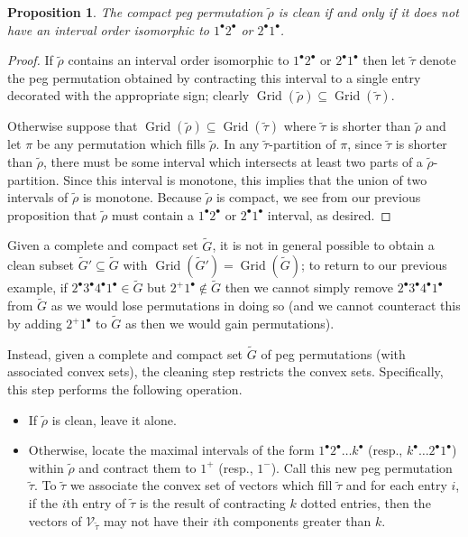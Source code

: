 \documentclass[10pt]{article}
\theoremstyle{plain}
\newtheorem{proposition}[theorem]{Proposition}
\theoremstyle{definition}
\newcommand{\Grid}{\operatorname{Grid}}
\newcommand{\p}[1]{#1^+}
\newcommand{\m}[1]{#1^-}
\renewcommand{\d}[1]{#1^{\bullet}}
\begin{document}
\begin{proposition}
\label{prop-clean-iff}
The compact peg permutation $\tilde{\rho}$ is clean if and only if it does not have an interval order isomorphic to $\d{1}\d{2}$ or $\d{2}\d{1}$.
\end{proposition}
\begin{proof}
If $\tilde{\rho}$ contains an interval order isomorphic to $\d{1}\d{2}$ or $\d{2}\d{1}$ then let $\tilde{\tau}$ denote the peg permutation obtained by contracting this interval to a single entry decorated with the appropriate sign; clearly $\Grid(\tilde{\rho})\subseteq\Grid(\tilde{\tau})$.

Otherwise suppose that $\Grid(\tilde{\rho})\subseteq\Grid(\tilde{\tau})$ where $\tilde{\tau}$ is shorter than $\tilde{\rho}$ and let $\pi$ be any permutation which fills $\tilde{\rho}$. In any $\tilde{\tau}$-partition of $\pi$, since $\tilde{\tau}$ is shorter than $\tilde{\rho}$, there must be some interval which intersects at least two parts of a $\tilde{\rho}$-partition. Since this interval is monotone, this implies that the union of two intervals of $\tilde{\rho}$ is monotone. Because $\tilde{\rho}$ is compact, we see from our previous proposition that $\tilde{\rho}$ must contain a $\d{1}\d{2}$ or $\d{2}\d{1}$ interval, as desired.
\end{proof}

Given a complete and compact set $\tilde{G}$, it is not in general possible to obtain a clean subset $\tilde{G}'\subseteq\tilde{G}$ with $\Grid(\tilde{G}')=\Grid(\tilde{G})$; to return to our previous example, if $\d{2}\d{3}\d{4}\d{1}\in\tilde{G}$ but $\p{2}\d{1}\notin\tilde{G}$ then we cannot simply remove $\d{2}\d{3}\d{4}\d{1}$ from $\tilde{G}$ as we would lose permutations in doing so (and we cannot counteract this by adding $\p{2}\d{1}$ to $\tilde{G}$ as then we would gain permutations).

Instead, given a complete and compact set $\tilde{G}$ of peg permutations (with associated convex sets), the cleaning step restricts the convex sets. Specifically, this step performs the following operation.
\begin{itemize}
\item If $\tilde{\rho}$ is clean, leave it alone. 
\item Otherwise, locate the maximal intervals of the form $\d 1 \d 2 \dots \d k$ (resp., $\d k \dots \d 2 \d 1$) within $\tilde{\rho}$ and contract them to $\p 1$ (resp., $\m 1$). Call this new peg permutation $\tilde{\tau}$. To $\tilde{\tau}$ we associate the convex set of vectors which fill $\tilde{\tau}$ and for each entry $i$, if the $i$th entry of $\tilde{\tau}$ is the result of contracting $k$ dotted entries, then the vectors of $\mathcal{V}_{\tilde{\tau}}$ may not have their $i$th components greater than $k$.
\end{itemize}
\end{document}
